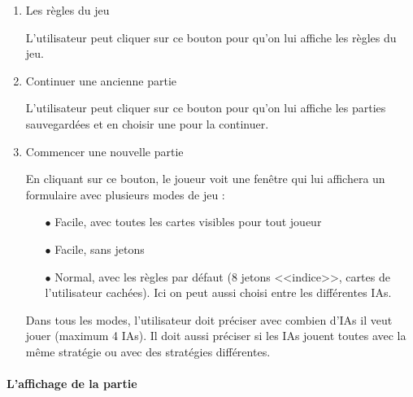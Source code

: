 \documentclass[11pt, letterpaper]{article}
\begin{document}
\begin{enumerate}

 \item  {Les règles du jeu}
 
  L'utilisateur peut cliquer sur ce bouton pour qu'on lui affiche les règles du jeu.\\


 \item  {Continuer une ancienne partie}
 
 L'utilisateur peut cliquer sur ce bouton pour qu'on lui affiche les parties sauvegardées et en choisir une pour la continuer.\\

 
 \item  {Commencer une nouvelle partie}

En cliquant sur ce bouton, le joueur voit une fenêtre qui lui affichera un formulaire avec plusieurs modes de jeu : \\

 \begin{itemize}
    \item[$\bullet$] Facile, avec toutes les cartes visibles pour tout joueur
    \item[$\bullet$] Facile, sans jetons
    \item[$\bullet$] Normal, avec les règles par défaut (8 jetons <<indice>>, cartes de l'utilisateur cachées). Ici on peut aussi choisi entre les différentes IAs.\\
 \end{itemize}

Dans tous les modes, l'utilisateur doit préciser avec combien d'IAs il veut jouer (maximum 4 IAs). Il doit aussi préciser si les IAs jouent toutes avec la même stratégie ou avec des stratégies différentes.

\end{enumerate}

\paragraph{L'affichage de la partie}
\end{document}
